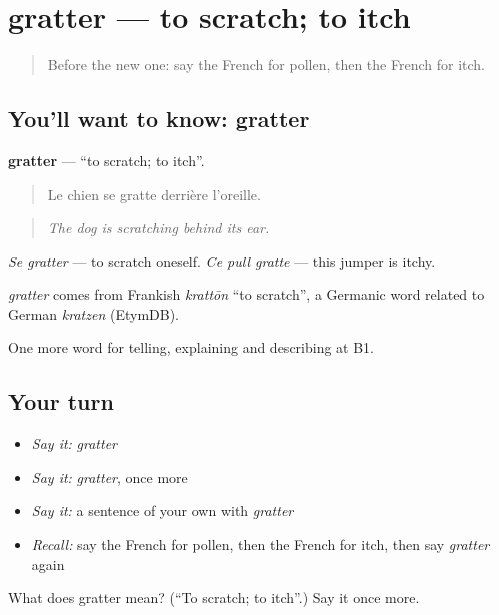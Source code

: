 \section[gratter]{gratter — to scratch; to itch}

\label{lesson:FR-C482-gratter}



\begin{quote}
Before the new one: say the French for pollen, then the French for itch.
\end{quote}

\subsection*{You'll want to know: gratter}
\textbf{gratter} — \textquotedblleft{}to scratch; to itch\textquotedblright{}.

\begin{quote}
Le chien se gratte derrière l'oreille.
\end{quote}

\begin{quote}
\emph{The dog is scratching behind its ear.}
\end{quote}

\emph{Se gratter} — to scratch oneself. \emph{Ce pull gratte} — this jumper is itchy.

\begin{cousinweb}
\emph{gratter} comes from Frankish \emph{krattōn} \textquotedblleft{}to scratch\textquotedblright{}, a Germanic word related to German \emph{kratzen} (EtymDB).
\end{cousinweb}

\begin{grammarlens}[title={What you've built}]
One more word for telling, explaining and describing at B1.
\end{grammarlens}

\subsection*{Your turn}
\begin{itemize}
\raggedright
  \item \emph{Say it:} \emph{gratter}
  \item \emph{Say it:} \emph{gratter}, once more
  \item \emph{Say it:} a sentence of your own with \emph{gratter}
  \item \emph{Recall:} say the French for pollen, then the French for itch, then say \emph{gratter} again
\end{itemize}

\begin{tcolorbox}[breakable,colback=teal!4,colframe=teal!35!black,title={Before you move on}]
What does gratter mean? (\textquotedblleft{}To scratch; to itch\textquotedblright{}.) Say it once more.
\end{tcolorbox}
